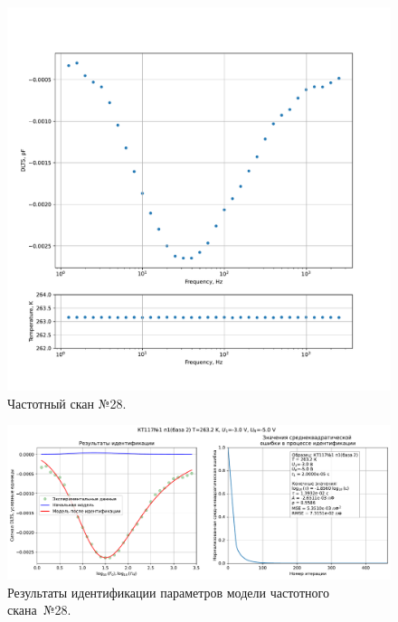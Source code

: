 \begin{figure}[!ht]
    \centering
    \includegraphics[width=1\textwidth]{../plots/КТ117№1_п1(база 2)_2500Гц-1Гц_1пФ_-10С_-3В-5В_50мВ_20мкс_шаг_0,1.pdf}
    \caption{Частотный скан №28.}
    \label{pic:frequency_scan_28}
\end{figure}

\begin{figure}[!ht]
    \centering
    \includegraphics[width=1\textwidth]{../plots/КТ117№1_п1(база 2)_2500Гц-1Гц_1пФ_-10С_-3В-5В_50мВ_20мкс_шаг_0,1_model.pdf}
    \caption{Результаты идентификации параметров модели частотного скана~№28.}
    \label{pic:frequency_scan_model28}
\end{figure}

\pagebreak


